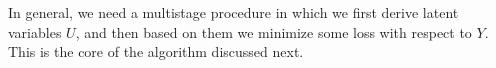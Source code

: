 
In general, we need a multistage procedure in which we first derive
latent variables $U$, and then based on them we minimize some loss
with respect to $Y$. This is the core of the algorithm discussed next.


